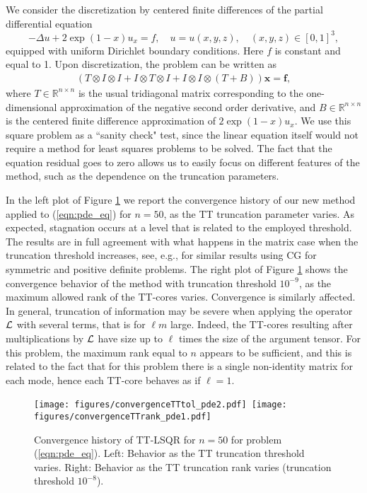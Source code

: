 \documentclass{siamart190516}
\newcommand{\bx}{\bm x}
\newcommand{\RR}{\mathbb R}
\begin{document}
We consider the discretization by centered finite differences of the partial differential
equation
$$
-\Delta u + 2 \exp(1-x) u_x = f, \quad u=u(x,y,z), \quad  (x,y,z)\in [0,1]^3 ,
$$
equipped with uniform Dirichlet boundary conditions. Here $f$ is constant and equal to 1.
 Upon discretization, the problem can be written as
\begin{eqnarray}\label{eqn:pde_eq}
\left ( T\otimes I \otimes I +  I\otimes T \otimes I +  I\otimes I \otimes (T+B) \right ) \bx = \bm f ,
\end{eqnarray}
where $T\in\RR^{n\times n}$ is the usual tridiagonal matrix corresponding to the one-dimensional 
approximation of the negative second order derivative, and $B\in\RR^{n\times n}$ is the centered finite difference
approximation of $2 \exp(1-x) u_x$. We use this square problem as a ``sanity check" test, since the linear equation itself would not require a method for least squares problems to be solved.
 The fact that the equation residual goes to zero allows us to easily focus on different features of the method, such as the dependence on the truncation parameters. 

In the left plot of Figure \ref{fig:pde_param} we report the convergence history of our new method applied to (\ref{eqn:pde_eq}) for $n=50$, as the TT truncation parameter varies. As expected, stagnation occurs at a level that is related to the employed threshold. The results are in full agreement with what happens in the matrix case when the truncation threshold increases, see, e.g., \cite{Kressner.Tobler.11} for similar results using CG for symmetric and positive definite problems. 
The right plot of Figure \ref{fig:pde_param} shows the convergence 
behavior of the method with truncation threshold $10^{-9}$, as the maximum allowed rank of the TT-cores varies. Convergence is similarly affected. In general, truncation of information may be severe when applying the operator $\cal L$ with several terms, that is
for $\ell m$ large. 
Indeed, the TT-cores resulting after multiplications by $\cal L$ have size up to $\ell$ times the size of the argument tensor.  For this problem, the maximum rank equal to $n$ appears to be sufficient, and this is related to the fact that for this problem there is a single non-identity matrix for each mode, hence each TT-core behaves as if $\ell=1$. 

\begin{figure}[htb]
\centering
\texttt{[image: figures/convergenceTTtol\_pde2.pdf]}\,
\texttt{[image: figures/convergenceTTrank\_pde1.pdf]}
\caption{Convergence history of TT-LSQR for $n=50$ for problem (\ref{eqn:pde_eq}). Left: Behavior as the TT truncation threshold varies. Right: Behavior as the TT truncation rank varies (truncation threshold $10^{-8}$).\label{fig:pde_param}}
\end{figure}
\end{document}
